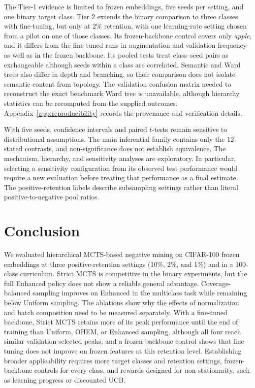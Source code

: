\documentclass[11pt]{article}
\begin{document}
The Tier-1 evidence is limited to frozen embeddings, five seeds per setting, and one binary target class. Tier 2 extends the binary comparison to three classes with fine-tuning, but only at 2\% retention, with one learning-rate setting chosen from a pilot on one of those classes. Its frozen-backbone control covers only \textit{apple}, and it differs from the fine-tuned runs in augmentation and validation frequency as well as in the frozen backbone. Its pooled tests treat class--seed pairs as exchangeable although seeds within a class are correlated. Semantic and Ward trees also differ in depth and branching, so their comparison does not isolate semantic content from topology. The validation confusion matrix needed to reconstruct the exact benchmark Ward tree is unavailable, although hierarchy statistics can be recomputed from the supplied outcomes. Appendix~\ref{app:reproducibility} records the provenance and verification details.

With five seeds, confidence intervals and paired $t$-tests remain sensitive to distributional assumptions. The main inferential family contains only the 12 stated contrasts, and non-significance does not establish equivalence. The mechanism, hierarchy, and sensitivity analyses are exploratory. In particular, selecting a sensitivity configuration from its observed test performance would require a new evaluation before treating that performance as a final estimate. The positive-retention labels describe subsampling settings rather than literal positive-to-negative pool ratios.

\section{Conclusion}
\label{sec:conclusion}
We evaluated hierarchical MCTS-based negative mining on CIFAR-100 frozen embeddings at three positive-retention settings (10\%, 2\%, and 1\%) and in a 100-class curriculum. Strict MCTS is competitive in the binary experiments, but the full Enhanced policy does not show a reliable general advantage. Coverage-balanced sampling improves on Enhanced in the multiclass task while remaining below Uniform sampling. The ablations show why the effects of normalization and batch composition need to be measured separately. With a fine-tuned backbone, Strict MCTS retains more of its peak performance until the end of training than Uniform, OHEM, or Enhanced sampling, although all four reach similar validation-selected peaks, and a frozen-backbone control shows that fine-tuning does not improve on frozen features at this retention level. Establishing broader applicability requires more target classes and retention settings, frozen-backbone controls for every class, and rewards designed for non-stationarity, such as learning progress or discounted UCB.
\end{document}
